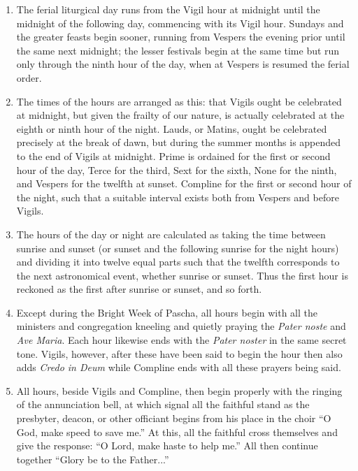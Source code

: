 			\begin{enumerate}
				\item The ferial liturgical day runs from the Vigil hour at midnight until the midnight of the following day, commencing with its Vigil hour. Sundays and the greater feasts begin sooner, running from Vespers the evening prior until the same next midnight; the lesser festivals begin at the same time but run only through the ninth hour of the day, when at Vespers is resumed the ferial order.
				
				\item The times of the hours are arranged as this: that Vigils ought be celebrated at midnight, but given the frailty of our nature, is actually celebrated at the eighth or ninth hour of the night. Lauds, or Matins, ought be celebrated precisely at the break of dawn, but during the summer months is appended to the end of Vigils at midnight. Prime is ordained for the first or second hour of the day, Terce for the third, Sext for the sixth, None for the ninth, and Vespers for the twelfth at sunset. Compline for the first or second hour of the night, such that a suitable interval exists both from Vespers and before Vigils.
				
				\item The hours of the day or night are calculated as taking the time between sunrise and sunset (or sunset and the following sunrise for the night hours) and dividing it into twelve equal parts such that the twelfth corresponds to the next astronomical event, whether sunrise or sunset. Thus the first hour is reckoned as the first after sunrise or sunset, and so forth.
				
			
				\item Except during the Bright Week of Pascha, all hours begin with all the ministers and congregation kneeling and quietly praying the \textit{Pater noste} and \textit{Ave Maria}. Each hour likewise ends with the \textit{Pater noster} in the same secret tone. Vigils, however, after these have been said to begin the hour then also adds \textit{Credo in Deum} while Compline ends with all these prayers being said.
				
				\item All hours, beside Vigils and Compline, then begin properly with the ringing of the annunciation bell, at which signal all the faithful stand as the presbyter, deacon, or other officiant begins from his place in the choir \enquote{O God, make speed to save me.} At this, all the faithful cross themselves and give the response: \enquote{O Lord, make haste to help me.} All then continue together \enquote{Glory be to the Father...}
				

\end{enumerate}
